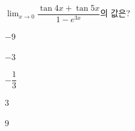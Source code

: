 $\displaystyle\lim_{x\to 0}\dfrac{\tan 4x+\tan 5x}{1-e^{3x}}$의 값은?
\begin{choices32}{\rule[-3ex]{0pt}{8ex}$-9$}{\rule[-3ex]{0pt}{8ex}$-3$}{\rule[-3ex]{0pt}{8ex}$-\dfrac{1}{3}$}{\rule[-3ex]{0pt}{8ex}$3$}{\rule[-3ex]{0pt}{8ex}$9$}\end{choices32}
